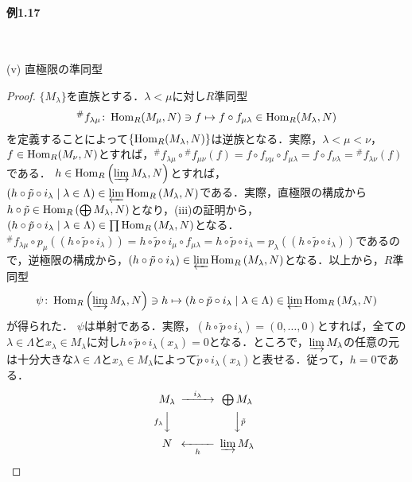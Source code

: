 \paragraph{例1.17}~
\begin{screen}
  (v) 直極限の準同型
\end{screen}
\begin{proof}
  $\{M_\lambda\}$を直族とする．$\lambda < \mu$に対し$R$準同型
  \[ {}^\# f_{\lambda\mu} \colon \operatorname{Hom}_R(M_\mu, N) \ni f \mapsto f \circ f_{\mu\lambda} \in \operatorname{Hom}_R(M_\lambda, N) \]
  を定義することによって$\{\operatorname{Hom}_R(M_\lambda, N)\}$は逆族となる．実際，$\lambda < \mu < \nu$，$f \in \operatorname{Hom}_R(M_\nu, N)$とすれば，${}^\# f_{\lambda\mu} \circ {}^\# f_{\mu\nu} (f) = f \circ f_{\nu\mu} \circ f_{\mu\lambda} = f \circ f_{\nu\lambda} = {}^\# f_{\lambda\nu} (f)$である．
  $h \in \operatorname{Hom}_R\left(\varinjlim M_\lambda, N\right)$とすれば，$(h \circ \tilde{p} \circ i_\lambda \mid \lambda \in \Lambda) \in \varprojlim \operatorname{Hom}_R\left(M_\lambda, N\right)$である．実際，直極限の構成から$h \circ \tilde{p} \in \operatorname{Hom}_R\left(\bigoplus M_\lambda, N\right)$となり，(iii)の証明から，$(h \circ \tilde{p} \circ i_\lambda \mid \lambda \in \Lambda) \in \prod \operatorname{Hom}_R\left(M_\lambda, N\right)$となる．
  ${}^\# f_{\lambda\mu} \circ p_\mu ((h \circ \tilde{p} \circ i_\lambda)) = h \circ \tilde{p} \circ i_\mu \circ f_{\mu\lambda} = h \circ \tilde{p} \circ i_\lambda = p_\lambda ((h \circ \tilde{p} \circ i_\lambda))$であるので，逆極限の構成から，$(h \circ \tilde{p} \circ i_\lambda) \in \varprojlim \operatorname{Hom}_R\left(M_\lambda, N\right)$となる．以上から，$R$準同型
  \[\psi\colon \operatorname{Hom}_R\left(\varinjlim M_\lambda, N\right) \ni h \mapsto (h \circ \tilde{p} \circ i_\lambda \mid \lambda \in \Lambda) \in \varprojlim \operatorname{Hom}_R\left(M_\lambda, N\right)\]
  が得られた．
  $\psi$は単射である．実際，$(h \circ \tilde{p} \circ i_\lambda) = (0,\ldots, 0)$とすれば，全ての$\lambda \in \Lambda$と$x_\lambda \in M_\lambda$に対し$h \circ \tilde{p} \circ i_\lambda (x_\lambda) = 0$となる．ところで，$\varinjlim M_\lambda$の任意の元は十分大きな$\lambda \in \Lambda$と$x_\lambda \in M_\lambda$によって$\tilde{p} \circ i_\lambda (x_\lambda)$と表せる．従って，$h=0$である．
  \[
  \begin{CD}
    M_\lambda @>{i_\lambda}>> \bigoplus M_\lambda \\
    @V{f_\lambda}VV @VV{\tilde{p}}V \\
    N @<<{h}< \varinjlim M_\lambda
  \end{CD}
  \]

\end{proof}
